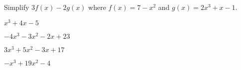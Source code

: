 \begin{readinessAssuranceTest}
\item Simplify \(3f(x)-2g(x)\) where
      \(f(x)=7-x^2\) and
      \(g(x)=2x^3+x-1\).

\begin{multicols}{4}
\begin{readinessAssuranceTestChoices}
\item \(x^3+4x-5\)
\item \(-4x^3-3x^2-2x+23\)
\item \(3x^3+5x^2-3x+17\)
\item \(-x^3+19x^2-4\)
\end{readinessAssuranceTestChoices}
\end{multicols}

%



\end{readinessAssuranceTest}

